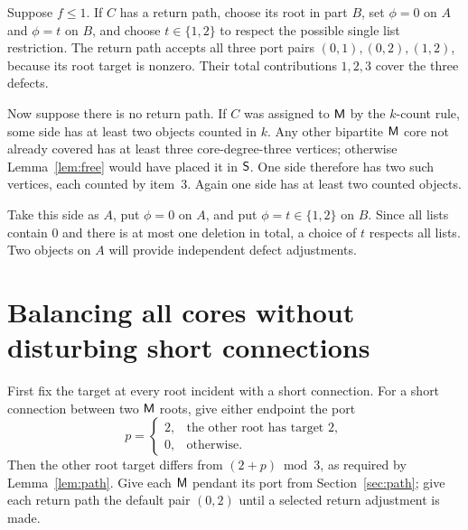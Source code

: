 Suppose $f\le1$.  If $C$ has a return path, choose its root in part
$B$, set $\phi=0$ on $A$ and $\phi=t$ on $B$, and choose
$t\in\{1,2\}$ to respect the possible single list restriction.
The return path accepts all three port pairs $(0,1),(0,2),(1,2)$,
because its root target is nonzero.  Their total contributions
$1,2,3$ cover the three defects.

Now suppose there is no return path.  If $C$ was assigned to $\mathsf M$
by the $k$-count rule, some side has at least two objects counted in
$k$.  Any other bipartite $\mathsf M$ core not already covered has at
least three core-degree-three vertices; otherwise
Lemma~\ref{lem:free} would have placed it in $\mathsf S$.  One side
therefore has two such vertices, each counted by item~3.  Again one
side has at least two counted objects.

Take this side as $A$, put $\phi=0$ on $A$, and put
$\phi=t\in\{1,2\}$ on $B$.  Since all lists contain 0 and there
is at most one deletion in total, a choice of $t$ respects all lists.
Two objects on $A$ will provide independent defect adjustments.

\section{Balancing all cores without disturbing short connections}
\label{sec:controls}

First fix the target at every root incident with a short connection.
For a short connection between two $\mathsf M$ roots, give either endpoint
the port
\begin{equation}\label{eq:shortchoice}
 p=\begin{cases}2,&\text{the other root has target }2,\\
                  0,&\text{otherwise}.
   \end{cases}
\end{equation}
Then the other root target differs from $(2+p)\bmod3$, as required
by Lemma~\ref{lem:path}.  Give each $\mathsf M$ pendant its port from
Section~\ref{sec:path}; give each return path the default pair
$(0,2)$ until a selected return adjustment is made.

